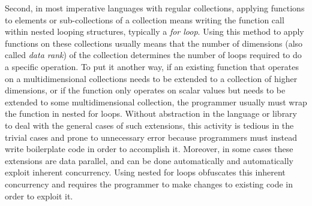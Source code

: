 Second, in most imperative languages with regular collections, 
applying functions to elements or sub-collections of a collection means 
writing the function call within nested looping structures, typically a \textit{for loop}.
Using this method to apply functions on these collections usually means that 
the number of dimensions (also called \textit{data rank}) of the collection 
determines the number of loops required to do a specific operation.
To put it another way, if an existing function that operates on a multidimensional collections 
needs to be extended to a collection of higher dimensions, 
or if the function only operates on scalar values but needs to be extended to some multidimensional collection, 
the programmer usually must wrap the function in nested for loops.
Without abstraction in the language or library to deal with the general cases of such extensions, 
this activity is tedious %
in the trivial cases and prone to unnecessary error 
because programmers must instead write boilerplate code %
in order to accomplish it.
Moreover, in some cases these extensions are data parallel, 
and can be done automatically and automatically exploit inherent concurrency.
Using nested for loops obfuscates this inherent concurrency and 
requires the programmer to make changes to existing code in order to exploit it. %

